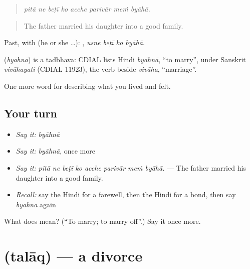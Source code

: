 \begin{quote}
\emph{pitā ne beṭī ko acche parivār meṁ byāhā.}
\end{quote}

\begin{quote}
The father married his daughter into a good family.
\end{quote}

Past, with  (he or she …):    , \emph{usne beṭī ko byāhā}.

\begin{cousinweb}
\textbf{} (\emph{byāhnā}) is a tadbhava: CDIAL lists Hindi \emph{byāhnā}, \textquotedblleft{}to marry\textquotedblright{}, under Sanskrit \emph{vivāhayati} (CDIAL 11923), the verb beside \emph{vivāha}, \textquotedblleft{}marriage\textquotedblright{}.
\end{cousinweb}

\begin{grammarlens}[title={What you've built}]
One more word for describing what you lived and felt.
\end{grammarlens}

\subsection*{Your turn}
\begin{itemize}
\raggedright
  \item \emph{Say it:} \emph{byāhnā}
  \item \emph{Say it:} \emph{byāhnā}, once more
  \item \emph{Say it:} \emph{pitā ne beṭī ko acche parivār meṁ byāhā.} — The father married his daughter into a good family.
  \item \emph{Recall:} say the Hindi for a farewell, then the Hindi for a bond, then say \emph{byāhnā} again
\end{itemize}

\begin{tcolorbox}[breakable,colback=teal!4,colframe=teal!35!black,title={Before you move on}]
What does  mean? (\textquotedblleft{}To marry; to marry off\textquotedblright{}.) Say it once more.
\end{tcolorbox}
\section[\texorpdfstring{\hi{तलाक़} (talāq)}{तलाक़ (talāq)}]{ (talāq) — a divorce}

